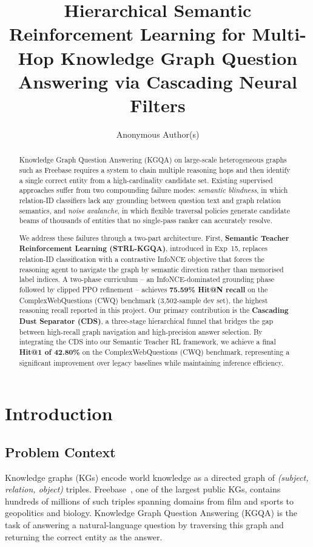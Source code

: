 \documentclass[11pt,a4paper]{article}
\title{%
    Hierarchical Semantic Reinforcement Learning for
    Multi-Hop Knowledge Graph Question Answering
    via Cascading Neural Filters
}
\author{%
    Anonymous Author(s)
}
\makeatletter
\newcommand{\STRL}{\textsc{STRL-KGQA}}
\newcommand{\HitOne}{Hit@1}
\makeatother
\begin{document}
\maketitle

\begin{abstract}
Knowledge Graph Question Answering (KGQA) on large-scale heterogeneous graphs
such as Freebase requires a system to chain multiple reasoning hops and then
identify a single correct entity from a high-cardinality candidate set.
Existing supervised approaches suffer from two compounding failure modes:
\emph{semantic blindness}, in which relation-ID classifiers lack any grounding
between question text and graph relation semantics, and \emph{noise avalanche},
in which flexible traversal policies generate candidate beams of thousands of
entities that no single-pass ranker can accurately resolve.

We address these failures through a two-part architecture.
First, \textbf{Semantic Teacher Reinforcement Learning (\STRL{})}, introduced
in Exp~15, replaces relation-ID classification with a contrastive
InfoNCE objective that forces the reasoning agent to navigate the graph by
semantic direction rather than memorised label indices.
A two-phase curriculum -- an InfoNCE-dominated grounding phase followed by
clipped PPO refinement -- achieves \textbf{75.59\% Hit@N recall} on the
ComplexWebQuestions (CWQ) benchmark (3,502-sample dev set), the highest
reasoning recall reported in this project.
Our primary contribution is the \textbf{Cascading Dust Separator (CDS)}, a three-stage hierarchical funnel that bridges the gap between high-recall graph navigation and high-precision answer selection. By integrating the CDS into our Semantic Teacher RL framework, we achieve a final \textbf{\HitOne{} of 42.80\%} on the ComplexWebQuestions (CWQ) benchmark, representing a significant improvement over legacy baselines while maintaining inference efficiency.
\end{abstract}


\section{Introduction}
\label{sec:intro}

\subsection{Problem Context}
Knowledge graphs (KGs) encode world knowledge as a directed graph of
\emph{(subject, relation, object)} triples.
Freebase~\cite{bollacker2008freebase}, one of the largest public KGs,
contains hundreds of millions of such triples spanning domains from film
and sports to geopolitics and biology.
Knowledge Graph Question Answering (KGQA) is the task of answering a
natural-language question by traversing this graph and returning the
correct entity as the answer.
\end{document}
